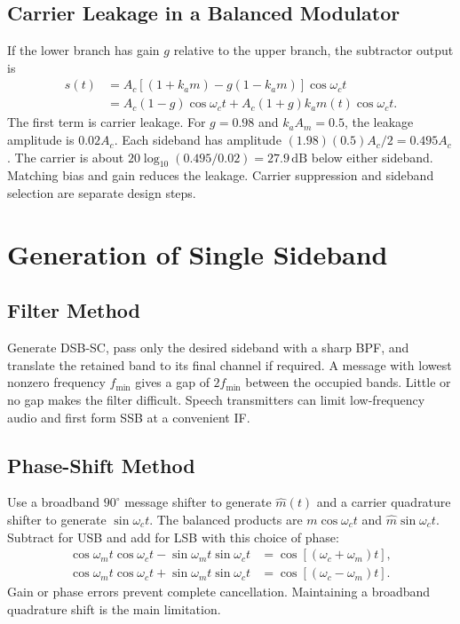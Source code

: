 \documentclass[12pt,a4paper]{article}
\begin{document}
\subsection{Carrier Leakage in a Balanced Modulator}
If the lower branch has gain $g$ relative to the upper branch, the subtractor output is
\[
\begin{aligned}
 s(t) &= A_c[(1+k_am)-g(1-k_am)]\cos\omega_ct\\
      &= A_c(1-g)\cos\omega_ct
        +A_c(1+g)k_am(t)\cos\omega_ct.
\end{aligned}
\]
The first term is carrier leakage. For $g=0.98$ and $k_aA_m=0.5$, the leakage amplitude is $0.02A_c$. Each sideband has amplitude $(1.98)(0.5)A_c/2=0.495A_c$. The carrier is about $20\log_{10}(0.495/0.02)=27.9\,\mathrm{dB}$ below either sideband. Matching bias and gain reduces the leakage. Carrier suppression and sideband selection are separate design steps.

\section{Generation of Single Sideband}
\subsection{Filter Method}
Generate DSB-SC, pass only the desired sideband with a sharp BPF, and translate the retained band to its final channel if required. A message with lowest nonzero frequency $f_{\min}$ gives a gap of $2f_{\min}$ between the occupied bands. Little or no gap makes the filter difficult. Speech transmitters can limit low-frequency audio and first form SSB at a convenient IF.

\subsection{Phase-Shift Method}
Use a broadband $90^\circ$ message shifter to generate $\widehat m(t)$ and a carrier quadrature shifter to generate $\sin\omega_ct$. The balanced products are $m\cos\omega_ct$ and $\widehat m\sin\omega_ct$. Subtract for USB and add for LSB with this choice of phase:
\[
\begin{aligned}
 \cos\omega_mt\cos\omega_ct-\sin\omega_mt\sin\omega_ct
   &=\cos[(\omega_c+\omega_m)t],\\
 \cos\omega_mt\cos\omega_ct+\sin\omega_mt\sin\omega_ct
   &=\cos[(\omega_c-\omega_m)t].
\end{aligned}
\]
Gain or phase errors prevent complete cancellation. Maintaining a broadband quadrature shift is the main limitation.
\end{document}
